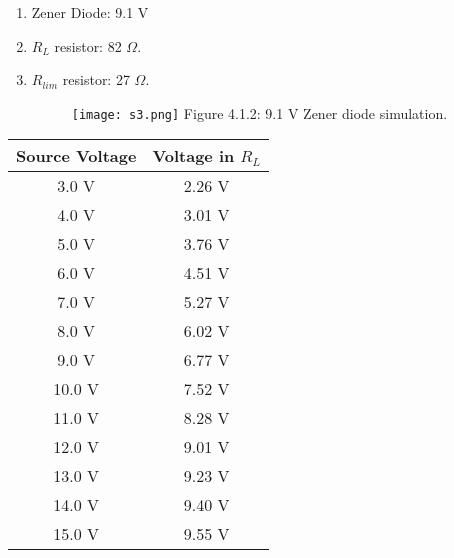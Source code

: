 \begin{tasks}
\begin{enumerate}
\item Zener Diode: 9.1 V
\item $R_{L}$ resistor: 82 $\Omega$.
\item $R_{lim}$ resistor: 27 $\Omega$.
\begin{figure}[H]
\texttt{[image: s3.png]}
\centering \linebreak \linebreak Figure 4.1.2: 9.1 V Zener diode simulation.
\end{figure}
\end{enumerate}

\begin{center}
\begin{tabular}[.5cm]{ c c }
\toprule
Source Voltage & Voltage in $R_{L}$ \\
\midrule
3.0 V & 2.26 V \\
\cmidrule{1-2}
4.0 V & 3.01 V \\
\cmidrule{1-2}
5.0 V & 3.76 V \\
\cmidrule{1-2}
6.0 V & 4.51 V \\
\cmidrule{1-2}
7.0 V & 5.27 V \\
\cmidrule{1-2}
8.0 V & 6.02 V \\
\cmidrule{1-2}
9.0 V & 6.77 V \\
\cmidrule{1-2}
10.0 V & 7.52 V \\
\cmidrule{1-2}
11.0 V & 8.28 V \\
\cmidrule{1-2}
12.0 V & 9.01 V \\
\cmidrule{1-2}
13.0 V & 9.23 V \\
\cmidrule{1-2}
14.0 V & 9.40 V \\
\cmidrule{1-2}
15.0 V & 9.55 V \\
\bottomrule
\end{tabular}
\end{center}
\end{tasks}

\pagebreak